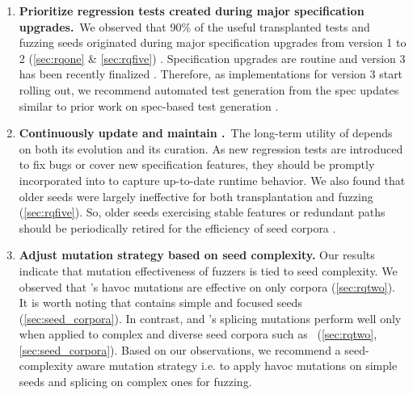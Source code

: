 \documentclass[lettersize,journal]{IEEEtran}
\begin{document}
\begin{enumerate}[
    leftmargin=0pt,
    itemsep=0pt,
    parsep=0pt,
    topsep=2pt,
    partopsep=0pt,
    label=,
]
\item \textbf{Prioritize regression tests created during major specification upgrades.}~We observed that 90\% of the useful transplanted tests and fuzzing seeds originated during major specification upgrades from version 1 to 2 (\textsection{}\ref{sec:rqone} \& \ref{sec:rqfive}) \cite{changelog1, changelog2}. Specification upgrades are routine and version 3 has been recently finalized \cite{changelog3}. Therefore, as implementations for version 3 start rolling out, we recommend automated test generation from the spec updates similar to prior work on spec-based test generation \cite{rao2024diffspec}.

\item \textbf{Continuously update and maintain \tname{}.}~The long-term utility of \tname{} depends on both its evolution and its curation. As new regression tests are introduced to fix bugs or cover new specification features, they should be promptly incorporated into \tname{} to capture up-to-date runtime behavior. We also found that older seeds were largely ineffective for both transplantation and fuzzing (\textsection{}\ref{sec:rqfive}). So, older seeds exercising stable features or redundant paths should be periodically retired for the efficiency of \tname{} seed corpora \cite{li2025improving, rebert2014optimizing, herrera2021seed}.

\item \textbf{Adjust mutation strategy based on seed complexity.}
Our results indicate that mutation effectiveness of \wasm{} fuzzers is tied to seed complexity. We observed that \wadiff{}'s havoc mutations are effective on only \specbench{} corpora (\textsection{}\ref{sec:rqtwo}). It is worth noting that \specbench{} contains simple and focused seeds (\textsection{}\ref{sec:seed_corpora}). In contrast, \wasmaker{} and \wapplique{}’s splicing mutations perform well only when applied to complex and diverse seed corpora such as \rtbench{}~(\textsection{}\ref{sec:rqtwo}, \textsection{}\ref{sec:seed_corpora}). Based on our observations, we recommend a seed-complexity aware mutation strategy i.e. to apply havoc mutations on simple seeds and splicing on complex ones for \wasm{} fuzzing.
\end{enumerate}
\end{document}
